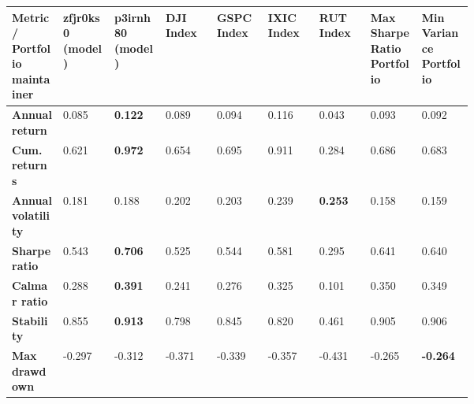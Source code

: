 \documentclass[../xlapes02]{subfiles}
\begin{document}
    \begin{table}[H]
        \centering
        {\footnotesize\begin{tabular}{*{9}{|m{0.075\linewidth}|}}
                          \toprule
                          \bfseries Metric / Portfolio maintainer & \bfseries zfjr0ks0 (model) & \bfseries p3irnh80 (model)           & \bfseries DJI Index                   & \bfseries GSPC Index & \bfseries IXIC Index & \bfseries RUT Index & \bfseries Max Sharpe Ratio Portfolio & \bfseries Min Variance Portfolio \\[0.4cm]
                          \midrule
                          \bfseries Annual return       & 0.085                      & \color[HTML]{00F000} \bfseries 0.122 & 0.089                                 & 0.094                & 0.116 & 0.043 & 0.093 & 0.092 \\[0.4cm]
                          \bfseries Cum.\ returns       & 0.621                      & \color[HTML]{00F000} \bfseries 0.972 & 0.654                                 & 0.695                & 0.911 & 0.284 & 0.686 & 0.683 \\[0.4cm]
                          \bfseries Annual volatility   & 0.181                      & 0.188                                & 0.202                                 & 0.203                & 0.239                & \color[HTML]{00F000} \bfseries 0.253 & 0.158 & 0.159 \\[0.4cm]
                          \bfseries Sharpe ratio        & 0.543                      & \color[HTML]{00F000} \bfseries 0.706 & 0.525                                 & 0.544                & 0.581 & 0.295 & 0.641 & 0.640 \\[0.4cm]
                          \bfseries Calmar ratio        & 0.288                      & \color[HTML]{00F000} \bfseries 0.391 & 0.241                                 & 0.276                & 0.325 & 0.101 & 0.350 & 0.349 \\[0.4cm]
                          \bfseries Stability           & 0.855                      & \color[HTML]{00F000} \bfseries 0.913 & 0.798                                 & 0.845                & 0.820 & 0.461 & 0.905 & 0.906 \\[0.4cm]
                          \bfseries Max drawdown        & -0.297                     & -0.312                               & -0.371                                & -0.339               & -0.357               & -0.431                               & -0.265                               & \color[HTML]{00F000} \bfseries -0.264 \\[0.4cm]

\end{tabular}}
\end{table}
\end{document}
